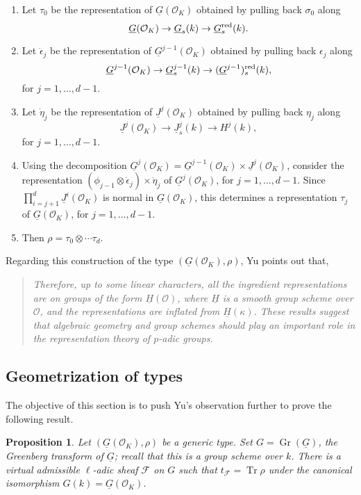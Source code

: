 \documentclass[10pt]{amsart}
\theoremstyle{plain}
\newtheorem{proposition}[theorem]{Proposition}
\theoremstyle{definition}
\newcommand{\OK}{\mathcal{O}_K}
\newcommand{\Fq}{k}
\DeclareMathOperator{\Gr}{Gr}
\DeclareMathOperator{\trace}{Tr}
\newcommand{\trFrob}[1]{t_{#1}}
\begin{document}
\begin{enumerate}
\item 
	Let $\tau_0$ be the representation of $\underline{G}(\OK)$ obtained by pulling back $\sigma_0$ along 
\[\underline{G}(\OK) \to \underline{G}_s(\Fq) \to \underline{G}_s\red(\Fq).\]
\item 
	Let $\dot{\epsilon}_j$ be the representation of $\underline{G}^{j-1}(\OK)$ obtained by pulling back $\epsilon_j$ along 
\[\underline{G}^{j-1}(\OK) \to \underline{G}^{j-1}_s(\Fq) \to (\underline{G}^{j-1})_s\red(\Fq),\]
for $j=1,\ldots, d-1$.
\item
	Let $\dot{\eta}_j$ be the representation of $\underline{J}^j(\OK)$ obtained by pulling back $\eta_j$ along 
\[\underline{J}^{j}(\OK) \to \underline{J}^{j}_s(\Fq) \to H^j(\Fq),\]
for $j=1,\ldots, d-1$.
\item
	Using the decomposition $\underline{G}^j(\OK) = \underline{G}^{j-1}(\OK) \times \underline{J}^j(\OK)$, consider the representation $(\phi_{j-1}\otimes \dot{\epsilon}_j)\times \dot{\eta}_j$ of $\underline{G}^{j}(\OK)$, for $j=1,\ldots, d-1$. 
	Since $\prod_{i=j+1}^{d} \underline{J}^i(\OK)$ is normal in $\underline{G}(\OK)$, this determines a representation $\tau_j$ of $\underline{G}(\OK)$, for $j=1,\ldots, d-1$. 
\item
	Then $\rho = \tau_0 \otimes \cdots \tau_d$.
\end{enumerate}

Regarding this construction of the type $(\underline{G}(\OK),\rho)$, Yu points out that,
\begin{quotation}
{\it Therefore, up to some linear characters, all the ingredient representations are on groups of
 the form $\underline{H}(\mathcal{O})$, where $\underline{H}$ is a smooth group scheme over $\mathcal{O}$, and the representations are inflated from $\underline{H}(\kappa)$. These results suggest that algebraic geometry and group schemes should play an
important role in the representation theory of $p$-adic groups.} \cite{yu:models}
\end{quotation}
%

\subsection{Geometrization of types}

The objective of this section is to push Yu's observation further to prove the following result.

\begin{proposition}\label{prop:types}
Let $(\underline{G}(\OK),\rho)$ be a generic type.
Set $G = \Gr(\underline{G})$, the Greenberg transform of $\underline{G}$; recall that this is a group scheme over $\Fq$.
There is a virtual admissible $\ell$-adic sheaf $\mathcal{F}$ on $G$ such that $\trFrob{\mathcal{F}} = \trace \rho$ under the canonical isomorphism $G(\Fq) = \underline{G}(\OK)$.
\end{proposition}
\end{document}
